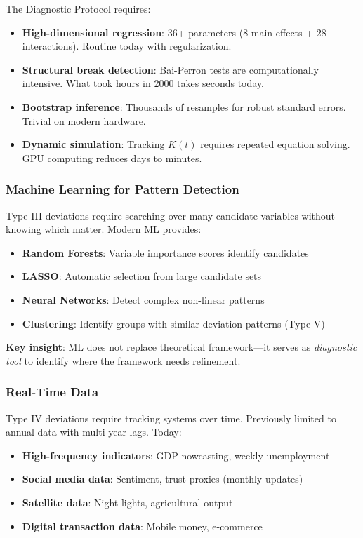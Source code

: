 The Diagnostic Protocol requires:
\begin{itemize}
    \item \textbf{High-dimensional regression}: 36+ parameters (8 main effects + 
          28 interactions). Routine today with regularization.
    \item \textbf{Structural break detection}: Bai-Perron tests are computationally 
          intensive. What took hours in 2000 takes seconds today.
    \item \textbf{Bootstrap inference}: Thousands of resamples for robust standard 
          errors. Trivial on modern hardware.
    \item \textbf{Dynamic simulation}: Tracking $K(t)$ requires repeated equation 
          solving. GPU computing reduces days to minutes.
\end{itemize}

\subsubsection{Machine Learning for Pattern Detection}

Type III deviations require searching over many candidate variables without 
knowing which matter. Modern ML provides:
\begin{itemize}
    \item \textbf{Random Forests}: Variable importance scores identify candidates
    \item \textbf{LASSO}: Automatic selection from large candidate sets
    \item \textbf{Neural Networks}: Detect complex non-linear patterns
    \item \textbf{Clustering}: Identify groups with similar deviation patterns (Type V)
\end{itemize}

\textbf{Key insight}: ML does not replace theoretical framework---it serves 
as \textit{diagnostic tool} to identify where the framework needs refinement.

\subsubsection{Real-Time Data}

Type IV deviations require tracking systems over time. Previously limited 
to annual data with multi-year lags. Today:
\begin{itemize}
    \item \textbf{High-frequency indicators}: GDP nowcasting, weekly unemployment
    \item \textbf{Social media data}: Sentiment, trust proxies (monthly updates)
    \item \textbf{Satellite data}: Night lights, agricultural output
    \item \textbf{Digital transaction data}: Mobile money, e-commerce
\end{itemize}

